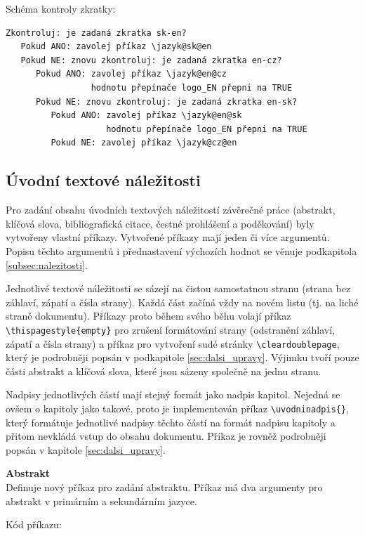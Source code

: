 Schéma kontroly zkratky:

\begin{verbatim}
Zkontroluj: je zadaná zkratka sk-en?
   Pokud ANO: zavolej příkaz \jazyk@sk@en
   Pokud NE: znovu zkontroluj: je zadaná zkratka en-cz?
      Pokud ANO: zavolej příkaz \jazyk@en@cz
                 hodnotu přepínače logo_EN přepni na TRUE
      Pokud NE: znovu zkontroluj: je zadaná zkratka en-sk?
         Pokud ANO: zavolej příkaz \jazyk@en@sk
                    hodnotu přepínače logo_EN přepni na TRUE
         Pokud NE: zavolej příkaz \jazyk@cz@en
\end{verbatim}



\subsection{Úvodní textové náležitosti}
\label{subsec:nalezitosti_sablona}
Pro zadání obsahu úvodních textových náležitostí závěrečné práce (abstrakt, klíčová slova, bibliografická citace, čestné prohlášení a poděkování) byly vytvořeny vlastní příkazy. Vytvořené příkazy mají jeden či více argumentů. Popisu těchto argumentů i přednastavení výchozích hodnot se věnuje podkapitola \ref{subsec:nalezitosti}.

Jednotlivé textové náležitosti se sázejí na čistou samostatnou stranu (strana bez záhlaví, zápatí a čísla strany). Každá část začíná vždy na novém listu (tj. na liché straně dokumentu). Příkazy proto během svého běhu volají příkaz \verb|\thispagestyle{empty}| pro zrušení formátování strany (odstranění záhlaví, zápatí a čísla strany) a příkaz pro  vytvoření sudé stránky \verb|\cleardoublepage|, který je podrobněji popsán v podkapitole \ref{sec:dalsi_upravy}. Výjimku tvoří pouze části abstrakt a klíčová slova, které jsou sázeny společně na jednu stranu.

Nadpisy jednotlivých částí mají stejný formát jako nadpis kapitol. Nejedná se ovšem o kapitoly jako takové, proto je implementován příkaz \verb|\uvodninadpis{}|, který formátuje jednotlivé nadpisy těchto částí na formát nadpisu kapitoly a přitom nevkládá vstup do obsahu dokumentu. Příkaz je rovněž podrobněji popsán v kapitole \ref{sec:dalsi_upravy}.

\vspace{8pt}
\textbf{Abstrakt}\\
Definuje nový příkaz pro zadání abstraktu. Příkaz má dva argumenty pro abstrakt v primárním a sekundárním jazyce.

\newpage
Kód příkazu:

